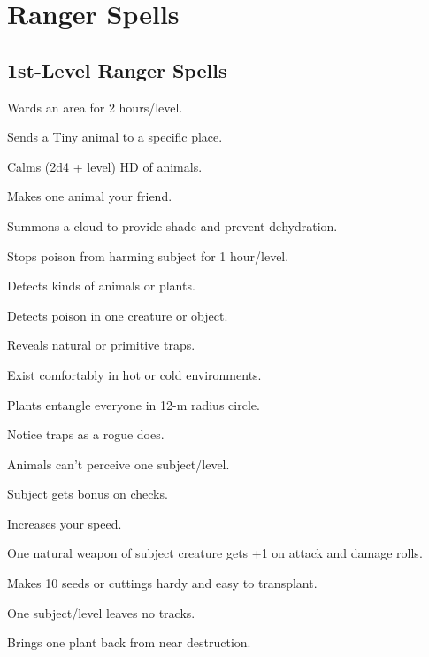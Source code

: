 \section{Ranger Spells}



\subsection{1st-Level Ranger Spells}

 Wards an area for 2 hours/level.

 Sends a Tiny animal to a specific place.

 Calms (2d4 + level) HD of animals.

 Makes one animal your friend.

 Summons a cloud to provide shade and prevent dehydration. %

 Stops poison from harming subject for 1 hour/level.

 Detects kinds of animals or plants.

 Detects poison in one creature or object.

 Reveals natural or primitive traps.

 Exist comfortably in hot or cold environments.

 Plants entangle everyone in 12-m radius circle.

 Notice traps as a rogue does.

 Animals can't perceive one subject/level.

 Subject gets bonus on  checks.

 Increases your speed.

 One natural weapon of subject creature gets +1 on attack and damage rolls.

 Makes 10 seeds or cuttings hardy and easy to transplant. %

 One subject/level leaves no tracks.

 Brings one plant back from near destruction. %

